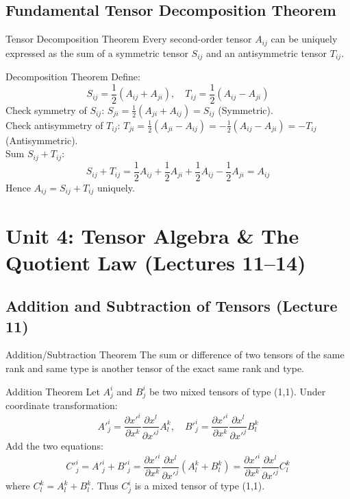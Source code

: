 \documentclass[11pt,a4paper]{article}
\begin{document}
\subsection{Fundamental Tensor Decomposition Theorem}
\begin{theorembox}{Tensor Decomposition Theorem}
Every second-order tensor $A_{ij}$ can be uniquely expressed as the sum of a symmetric tensor $S_{ij}$ and an antisymmetric tensor $T_{ij}$.
\end{theorembox}
\begin{proofbox}{Decomposition Theorem}
Define:
\[
S_{ij} = \frac{1}{2}(A_{ij} + A_{ji}), \quad T_{ij} = \frac{1}{2}(A_{ij} - A_{ji})
\]
Check symmetry of $S_{ij}$: $S_{ji} = \frac{1}{2}(A_{ji} + A_{ij}) = S_{ij}$ (Symmetric). \\
Check antisymmetry of $T_{ij}$: $T_{ji} = \frac{1}{2}(A_{ji} - A_{ij}) = -\frac{1}{2}(A_{ij} - A_{ji}) = -T_{ij}$ (Antisymmetric). \\
Sum $S_{ij} + T_{ij}$:
\[
S_{ij} + T_{ij} = \frac{1}{2} A_{ij} + \frac{1}{2} A_{ji} + \frac{1}{2} A_{ij} - \frac{1}{2} A_{ji} = A_{ij}
\]
Hence $A_{ij} = S_{ij} + T_{ij}$ uniquely.
\end{proofbox}

\newpage
\section{Unit 4: Tensor Algebra \& The Quotient Law (Lectures 11--14)}

\subsection{Addition and Subtraction of Tensors (Lecture 11)}
\begin{theorembox}{Addition/Subtraction Theorem}
The sum or difference of two tensors of the same rank and same type is another tensor of the exact same rank and type.
\end{theorembox}
\begin{proofbox}{Addition Theorem}
Let $A^i_j$ and $B^i_j$ be two mixed tensors of type (1,1). Under coordinate transformation:
\[
A'^i_j = \frac{\partial x'^i}{\partial x^k} \frac{\partial x^l}{\partial x'^j} A^k_l, \quad B'^i_j = \frac{\partial x'^i}{\partial x^k} \frac{\partial x^l}{\partial x'^j} B^k_l
\]
Add the two equations:
\[
C'^i_j = A'^i_j + B'^i_j = \frac{\partial x'^i}{\partial x^k} \frac{\partial x^l}{\partial x'^j} (A^k_l + B^k_l) = \frac{\partial x'^i}{\partial x^k} \frac{\partial x^l}{\partial x'^j} C^k_l
\]
where $C^k_l = A^k_l + B^k_l$. Thus $C^i_j$ is a mixed tensor of type (1,1).
\end{proofbox}
\end{document}
